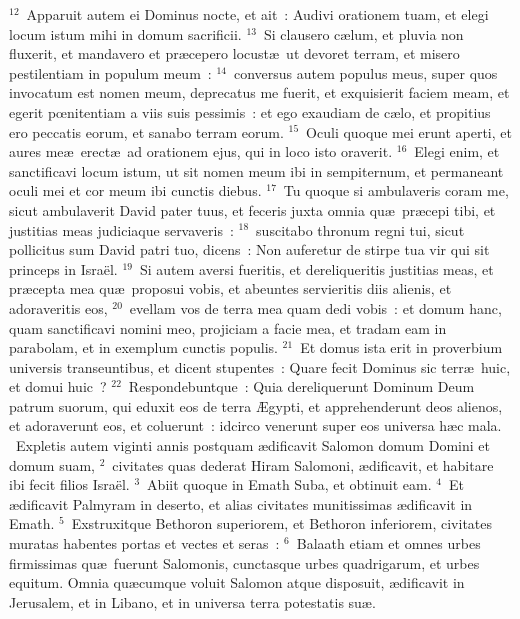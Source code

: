 ${}^{12}$~Apparuit autem ei Dominus nocte, et ait~: Audivi orationem tuam, et elegi locum istum mihi in domum sacrificii.
${}^{13}$~Si clausero c\ae lum, et pluvia non fluxerit, et mandavero et pr\ae cepero locust\ae\ ut devoret terram, et misero pestilentiam in populum meum~:
${}^{14}$~conversus autem populus meus, super quos invocatum est nomen meum, deprecatus me fuerit, et exquisierit faciem meam, et egerit pœnitentiam a viis suis pessimis~: et ego exaudiam de c\ae lo, et propitius ero peccatis eorum, et sanabo terram eorum.
${}^{15}$~Oculi quoque mei erunt aperti, et aures me\ae\ erect\ae\ ad orationem ejus, qui in loco isto oraverit.
${}^{16}$~Elegi enim, et sanctificavi locum istum, ut sit nomen meum ibi in sempiternum, et permaneant oculi mei et cor meum ibi cunctis diebus.
${}^{17}$~Tu quoque si ambulaveris coram me, sicut ambulaverit David pater tuus, et feceris juxta omnia qu\ae\ pr\ae cepi tibi, et justitias meas judiciaque servaveris~:
${}^{18}$~suscitabo thronum regni tui, sicut pollicitus sum David patri tuo, dicens~: Non auferetur de stirpe tua vir qui sit princeps in Isra\"el.
${}^{19}$~Si autem aversi fueritis, et dereliqueritis justitias meas, et pr\ae cepta mea qu\ae\ proposui vobis, et abeuntes servieritis diis alienis, et adoraveritis eos,
${}^{20}$~evellam vos de terra mea quam dedi vobis~: et domum hanc, quam sanctificavi nomini meo, projiciam a facie mea, et tradam eam in parabolam, et in exemplum cunctis populis.
${}^{21}$~Et domus ista erit in proverbium universis transeuntibus, et dicent stupentes~: Quare fecit Dominus sic terr\ae\ huic, et domui huic~?
${}^{22}$~Respondebuntque~: Quia dereliquerunt Dominum Deum patrum suorum, qui eduxit eos de terra \AE gypti, et apprehenderunt deos alienos, et adoraverunt eos, et coluerunt~: idcirco venerunt super eos universa h\ae c mala.
~\lettrine[lines=10,image=true,loversize=0.05,lraise=-0.03]{E}{}xpletis autem viginti annis postquam \ae dificavit Salomon domum Domini et domum suam,
${}^{2}$~civitates quas dederat Hiram Salomoni, \ae dificavit, et habitare ibi fecit filios Isra\"el.
${}^{3}$~Abiit quoque in Emath Suba, et obtinuit eam.
${}^{4}$~Et \ae dificavit Palmyram in deserto, et alias civitates munitissimas \ae dificavit in Emath.
${}^{5}$~Exstruxitque Bethoron superiorem, et Bethoron inferiorem, civitates muratas habentes portas et vectes et seras~:
${}^{6}$~Balaath etiam et omnes urbes firmissimas qu\ae\ fuerunt Salomonis, cunctasque urbes quadrigarum, et urbes equitum. Omnia qu\ae cumque voluit Salomon atque disposuit, \ae dificavit in Jerusalem, et in Libano, et in universa terra potestatis su\ae .
